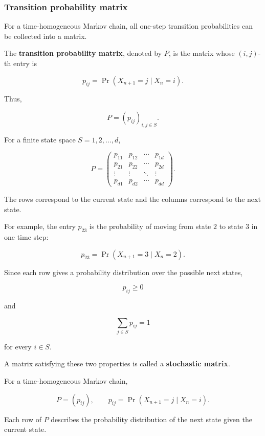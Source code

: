 \documentclass[
  letterpaper,
  DIV=11,
  numbers=noendperiod]{scrartcl}
\theoremstyle{definition}
\theoremstyle{remark}
\begin{document}
\subsubsection{Transition probability
matrix}\label{transition-probability-matrix}

For a time-homogeneous Markov chain, all one-step transition
probabilities can be collected into a matrix.

The \textbf{transition probability matrix}, denoted by \(P\), is the
matrix whose \((i,j)\)-th entry is

\[
p_{ij}=\Pr(X_{n+1}=j\mid X_n=i).
\]

Thus,

\[
P=(p_{ij})_{i,j\in S}.
\]

For a finite state space \(S={1,2,\ldots,d}\),

\[
P=
\begin{pmatrix}
p_{11} & p_{12} & \cdots & p_{1d}\\
p_{21} & p_{22} & \cdots & p_{2d}\\
\vdots & \vdots & \ddots & \vdots\\
p_{d1} & p_{d2} & \cdots & p_{dd}
\end{pmatrix}.
\]

The rows correspond to the current state and the columns correspond to
the next state.

For example, the entry \(p_{23}\) is the probability of moving from
state \(2\) to state \(3\) in one time step:

\[
p_{23}=\Pr(X_{n+1}=3\mid X_n=2).
\]

Since each row gives a probability distribution over the possible next
states,

\[
p_{ij}\geq 0
\]

and

\[
\sum_{j\in S}p_{ij}=1
\]

for every \(i\in S\).

A matrix satisfying these two properties is called a \textbf{stochastic
matrix}.

\begin{tcolorbox}[enhanced jigsaw, arc=.35mm, bottomrule=.15mm, bottomtitle=1mm, breakable, colback=white, colbacktitle=quarto-callout-note-color!10!white, colframe=quarto-callout-note-color-frame, coltitle=black, left=2mm, leftrule=.75mm, opacityback=0, opacitybacktitle=0.6, rightrule=.15mm, title=\textcolor{quarto-callout-note-color}{\faInfo}\hspace{0.5em}{Transition matrix}, titlerule=0mm, toprule=.15mm, toptitle=1mm]

For a time-homogeneous Markov chain,

\[
\boxed{
P=(p_{ij}),\qquad
p_{ij}=\Pr(X_{n+1}=j\mid X_n=i).
}
\]

Each row of \(P\) describes the probability distribution of the next
state given the current state.

\end{tcolorbox}
\end{document}
